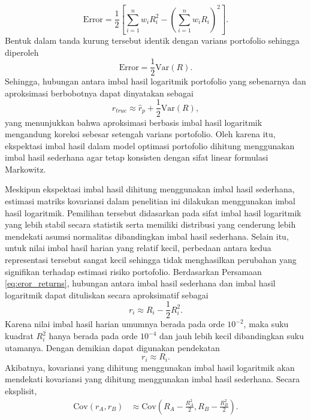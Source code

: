 \begin{equation*}
\text{Error}
=
\frac{1}{2}
\left[
\sum_{i=1}^{n} w_i R_i^2 - \left( \sum_{i=1}^{n} w_i R_i \right)^2
\right].
\end{equation*}
Bentuk dalam tanda kurung tersebut identik dengan varians portofolio sehingga diperoleh
\begin{equation}
\text{Error}
=
\frac{1}{2}
\text{Var}(R).
\end{equation}
Sehingga, hubungan antara imbal hasil logaritmik portofolio yang sebenarnya dan aproksimasi berbobotnya dapat dinyatakan sebagai
\begin{equation}
r_{true}
\approx
\hat{r}_p
+
\frac{1}{2}\text{Var}(R),
\label{eq:eror_returns}
\end{equation}
yang menunjukkan bahwa aproksimasi berbasis imbal hasil logaritmik mengandung koreksi sebesar setengah varians portofolio. Oleh karena itu, ekspektasi imbal hasil dalam model optimasi portofolio dihitung menggunakan imbal hasil sederhana agar tetap konsisten dengan sifat linear formulasi Markowitz.

Meskipun ekspektasi imbal hasil dihitung menggunakan imbal hasil sederhana, estimasi matriks kovariansi dalam penelitian ini dilakukan menggunakan imbal hasil logaritmik. Pemilihan tersebut didasarkan pada sifat imbal hasil logaritmik yang lebih stabil secara statistik serta memiliki distribusi yang cenderung lebih mendekati asumsi normalitas dibandingkan imbal hasil sederhana. Selain itu, untuk nilai imbal hasil harian yang relatif kecil, perbedaan antara kedua representasi tersebut sangat kecil sehingga tidak menghasilkan perubahan yang signifikan terhadap estimasi risiko portofolio. Berdasarkan Persamaan \ref{eq:eror_returns}, hubungan antara imbal hasil sederhana dan imbal hasil logaritmik dapat dituliskan secara aproksimatif sebagai
\begin{equation}
r_i \approx R_i - \frac{1}{2}R_i^2.
\end{equation}
Karena nilai imbal hasil harian umumnya berada pada orde $10^{-2}$, maka suku kuadrat $R_i^2$ hanya berada pada orde $10^{-4}$ dan jauh lebih kecil dibandingkan suku utamanya. Dengan demikian dapat digunakan pendekatan
\begin{equation}
r_i \approx R_i.
\end{equation}
Akibatnya, kovariansi yang dihitung menggunakan imbal hasil logaritmik akan mendekati kovariansi yang dihitung menggunakan imbal hasil sederhana. Secara eksplisit,
\begin{equation*}
\begin{aligned}
\text{Cov}(r_A,r_B)
&\approx
\text{Cov}
\left(
R_A-\frac{R_A^2}{2},
R_B-\frac{R_B^2}{2}
\right) .
\end{aligned}
\end{equation*}

